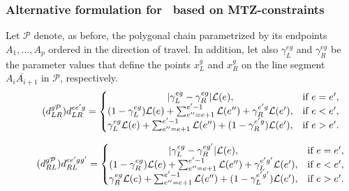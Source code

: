 \subsubsection{Alternative formulation for \PMD \  based on MTZ-constraints}


Let $\mathcal P$ denote, as before,  the polygonal chain parametrized by its endpoints $A_1, \ldots, A_p$ ordered in the direction of travel. In addition, let also $\gamma_{L}^{eg}$ and $\gamma_{R}^{eg}$ be the parameter values that define the points $x_L^g$ and $x_R^g$ on the line segment $\overline{A_iA_{i+1}}$ in $\mathcal P$, respectively. 
\begin{equation}\tag{$d_{LR}^{g\mathcal P}$}\label{eq:dLRPg}
d_{LR}^{ee'g} = \left\{\begin{matrix}
|\gamma_{L}^{eg} - \gamma_{R}^{eg}|\mathcal L(e), & \text{if } e = e',\\ 
(1 - \gamma_{L}^{eg})\mathcal L(e) + \sum_{e'' =e+1}^{e'-1}\mathcal L(e'') + \gamma_{R}^{e'g}\mathcal L(e'), & \text{if } e < e', \\
\gamma_{L}^{eg}\mathcal L(e) + \sum_{e'' = e+1}^{e'-1}\mathcal L(e'') + (1-\gamma_{R}^{e'g})\mathcal L(e'), & \text{if } e > e'.
\end{matrix}\right.
\end{equation}

\begin{equation}\tag{$d_{RL}^{g\mathcal P}$}\label{eq:dRLPg}
d_{RL}^{ee'gg'} = \left\{\begin{matrix}
|\gamma_{L}^{eg} - \gamma_{R}^{eg'}|\mathcal L(e), & \text{if } e = e',\\ 
(1 - \gamma_{R}^{eg})\mathcal L(e) + \sum_{e'' = e+1}^{e'-1}\mathcal L(e'') + \gamma_{L}^{e'g'}\mathcal L(e'), & \text{if } e < e',\\
\gamma_{R}^{eg}\mathcal L(e) + \sum_{e'' = e+1}^{e'-1}\mathcal L(e'') + (1-\gamma_{L}^{e'g'})\mathcal L(e'), & \text{if } e > e'.
\end{matrix}\right.
\end{equation}

